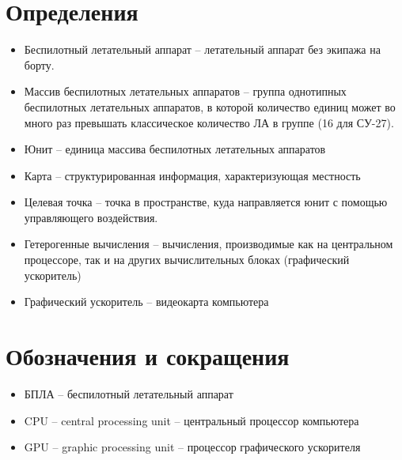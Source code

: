\newpage
\section{Определения}

\begin{itemize}
\item Беспилотный летательный аппарат -- летательный
      аппарат без экипажа \lb на борту.

\item Массив беспилотных летательных аппаратов -- группа
      однотипных беспилотных летательных аппаратов, в которой
      количество единиц может во много раз превышать
      классическое количество ЛА в группе (16 для СУ-27).

\item Юнит -- единица массива беспилотных летательных аппаратов

\item Карта -- структурированная информация, характеризующая местность

\item Целевая точка -- точка в пространстве, куда направляется юнит с 
    помощью управляющего воздействия.

\item Гетерогенные вычисления -- вычисления, производимые
      как на центральном процессоре, так и на других
      вычислительных блоках (графический ускоритель)

\item Графический ускоритель -- видеокарта компьютера

\end{itemize}

\newpage
\section{Обозначения и сокращения}

\begin{itemize}

\item БПЛА -- беспилотный летательный аппарат

\item CPU -- central processing unit -- центральный процессор компьютера

\item GPU -- graphic processing unit -- процессор графического ускорителя

\end{itemize}
